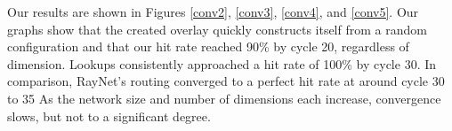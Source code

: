 \documentclass[11pt, conference, letterpaper]{IEEEtran}
\begin{document}

Our results are shown in Figures \ref{conv2}, \ref{conv3}, \ref{conv4}, and \ref{conv5}.
Our graphs show that the created overlay quickly constructs itself from a random configuration and that our hit rate reached 90\% by cycle 20, regardless of dimension.
Lookups consistently approached a hit rate of 100\% by cycle 30. 
In comparison, RayNet's routing converged to a perfect hit rate at around cycle 30 to 35 \cite{raynet} 
As the network size and number of dimensions each increase, convergence slows, but not to a significant degree.
\end{document}
